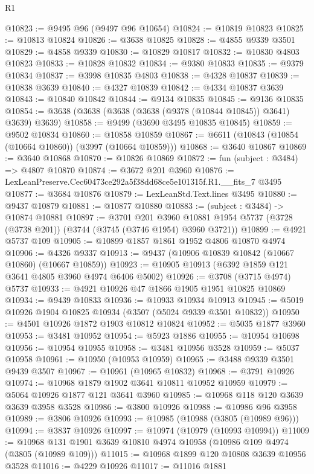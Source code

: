 \begin{lexlean}{R1}
\begin{coremodule}
@10823 := @9495 @96 (@9497 @96 @10654)
@10824 := @10819 @10823
@10825 := @10813 @10824
@10826 := @3638 @10825
@10828 := @4855 @9339 @3501
@10829 := @4858 @9339
@10830 := @10829 @10817
@10832 := @10830 @4803 @10823
@10833 := @10828 @10832
@10834 := @9380 @10833
@10835 := @9379 @10834
@10837 := @3998 @10835 @4803
@10838 := @4328 @10837
@10839 := @10838 @3639
@10840 := @4327 @10839
@10842 := @4334 @10837 @3639
@10843 := @10840 @10842
@10844 := @9134 @10835
@10845 := @9136 @10835
@10854 := @3638 (@3638 (@3638 (@3638 (@9378 (@10844 @10845)) @3641) @3639) @3639)
@10858 := @9499 (@3690 @3495 @10835 @10845)
@10859 := @9502 @10834
@10860 := @10858 @10859
@10867 := @6611 (@10843 (@10854 (@10664 @10860)) (@3997 (@10664 @10859)))
@10868 := @3640 @10867
@10869 := @3640 @10868
@10870 := @10826 @10869
@10872 := fun (subject : @3484) => @4807 @10870
@10874 := @3672 @201 @3960
@10876 := LexLeanPreserve.Cec60473ce292a5f38dd68ce5e101315f.R1.__fits_7 @3495
@10877 := @3684 @10876
@10879 := LexLeanStd.Text.lines @3495
@10880 := @9437 @10879
@10881 := @10877 @10880
@10883 := (subject : @3484) -> @10874 @10881
@10897 := @3701
    @201
    @3960
    @10881
    @1954
    @5737
    (@3728 (@3738 @201))
    (@3744 (@3745 (@3746 @1954) @3960 @3721))
@10899 := @4921 @5737 @109
@10905 := @10899 @1857 @1861 @1952 @4806 @10870 @4974
@10906 := @4326 @9337
@10913 := @9437 (@10906 @10839 @10842 (@10667 @10860) (@10667 @10859))
@10923 := @10905 @10913 (@6392 @1859 @121 @3641 @4805 @3960 @4974 @6406 @5002)
@10926 := @3708 (@3715 @4974) @5737
@10933 := @4921 @10926 @47 @1866 @1905 @1951 @10825 @10869
@10934 := @9439 @10833
@10936 := @10933 @10934 @10913
@10945 := @5019 @10926 @1904 @10825 @10934 (@3507 (@5024 @9339 @3501 @10832))
@10950 := @4501 @10926 @1872 @1903 @10812 @10824
@10952 := @5035 @1877 @3960
@10953 := @3481 @10952
@10954 := @5923 @1886
@10955 := @10954 @10698
@10956 := @10954 @10955
@10958 := @3481 @10956 @3528
@10959 := @5037 @10958
@10961 := @10950 (@10953 @10959)
@10965 := @3488 @9339 @3501 @9439 @3507
@10967 := @10961 (@10965 @10832)
@10968 := @3791 @10926
@10974 := @10968 @1879 @1902 @3641 @10811 @10952 @10959
@10979 := @5064 @10926 @1877 @121 @3641 @3960
@10985 := @10968 @118 @120 @3639 @3639 @3958 @3528
@10986 := @3800 @10926
@10988 := @10986 @96 @3958
@10989 := @3806 @10926
@10993 := @10985 (@10988 (@3805 (@10989 @96)))
@10994 := @3837 @10926
@10997 := @10974 (@10979 (@10993 @10994))
@11009 := @10968 @131 @1901 @3639 @10810 @4974 @10958 (@10986 @109 @4974 (@3805 (@10989 @109)))
@11015 := @10968 @1899 @120 @10808 @3639 @10956 @3528
@11016 := @4229 @10926
@11017 := @11016 @1881

\end{coremodule}
\end{lexlean}
